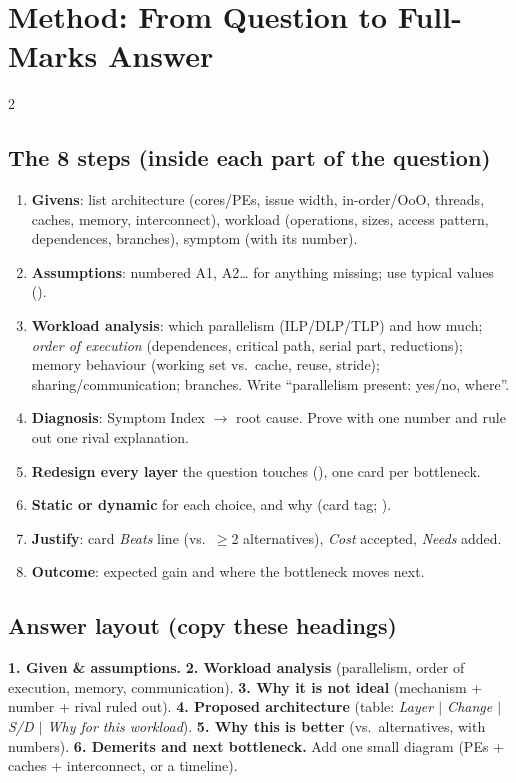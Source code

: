 \section{Method: From Question to Full-Marks Answer}\label{sec:method}

\begin{multicols}{2}
\subsection{The 8 steps (inside each part of the question)}
\begin{enumerate}[label=\textbf{\arabic*.}]
\item \textbf{Givens}: list architecture (cores/PEs, issue width, in-order/OoO, threads, caches, memory, interconnect), workload (operations, sizes, access pattern, dependences, branches), symptom (with its number).
\item \textbf{Assumptions}: numbered A1, A2\ldots{} for anything missing; use typical values ().
\item \textbf{Workload analysis}: which parallelism (ILP/DLP/TLP) and how much; \emph{order of execution} (dependences, critical path, serial part, reductions); memory behaviour (working set vs.\ cache, reuse, stride); sharing/communication; branches. Write ``parallelism present: yes/no, where''.
\item \textbf{Diagnosis}: Symptom Index $\rightarrow$ root cause. Prove with one number and rule out one rival explanation.
\item \textbf{Redesign every layer} the question touches (), one card per bottleneck.
\item \textbf{Static or dynamic} for each choice, and why (card tag; ).
\item \textbf{Justify}: card \emph{Beats} line (vs.\ $\ge$2 alternatives), \emph{Cost} accepted, \emph{Needs} added.
\item \textbf{Outcome}: expected gain and where the bottleneck moves next.
\end{enumerate}

\subsection{Answer layout (copy these headings)}\label{sec:layout}
\textbf{1. Given \& assumptions.} \textbf{2. Workload analysis} (parallelism, order of execution, memory, communication). \textbf{3. Why it is not ideal} (mechanism + number + rival ruled out). \textbf{4. Proposed architecture} (table: \emph{Layer $|$ Change $|$ S/D $|$ Why for this workload}). \textbf{5. Why this is better} (vs.\ alternatives, with numbers). \textbf{6. Demerits and next bottleneck.} Add one small diagram (PEs + caches + interconnect, or a timeline).


\end{multicols}
